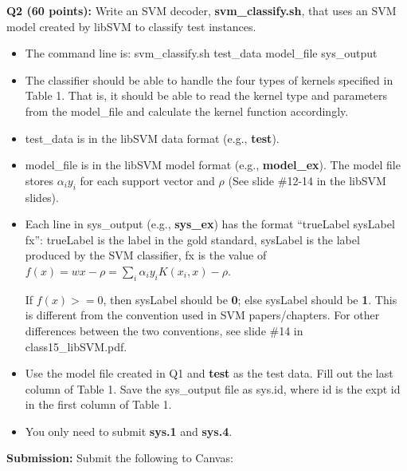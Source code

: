 \documentclass[11pt]{article}
\begin{document}
\vspace{0.5 in}
\noindent
{\bf Q2 (60 points):} Write an SVM decoder, {\bf svm\_classify.sh}, that uses
   an SVM model created by libSVM to classify test instances.

\begin{itemize}
  \item The command line is: svm\_classify.sh test\_data model\_file sys\_output

  \item The classifier should be able to handle the four types of kernels specified in Table 1. That is, it should be able to read the kernel type and parameters from the model\_file and calculate the kernel function accordingly.

  \item test\_data is in the libSVM data format (e.g., {\bf test}).

  \item model\_file is in the libSVM model format (e.g., {\bf model\_ex}).
        The model file stores 
        $\alpha_i y_i$ for each support vector and $\rho$
        (See slide \#12-14 in the libSVM slides).

  \item Each line in sys\_output (e.g., {\bf sys\_ex}) 
        has the format ``trueLabel sysLabel fx'': 
        trueLabel is the label in the gold standard, sysLabel is the label 
        produced by the SVM classifier, fx is the value of 
        $f(x)=wx-\rho=\sum_i \alpha_i y_i K(x_i, x)-\rho$.
        
        If $f(x)>=0$, then sysLabel should be {\bf 0}; 
           else sysLabel should be {\bf 1}.
        This is different from the convention used in SVM papers/chapters.
        For other differences between the two conventions, see
        slide \#14 in class15\_libSVM.pdf.

  \item Use the model file created in Q1 and {\bf test} as the test data.
        Fill out the last column of Table 1. Save the sys\_output file as
        sys.id, where id is the expt id in the first column of Table 1.

  \item You only need to submit {\bf sys.1} and {\bf sys.4}.

\end{itemize}


\vspace{0.5 in}
\noindent
{\bf Submission:}  Submit the following to Canvas:
\end{document}
